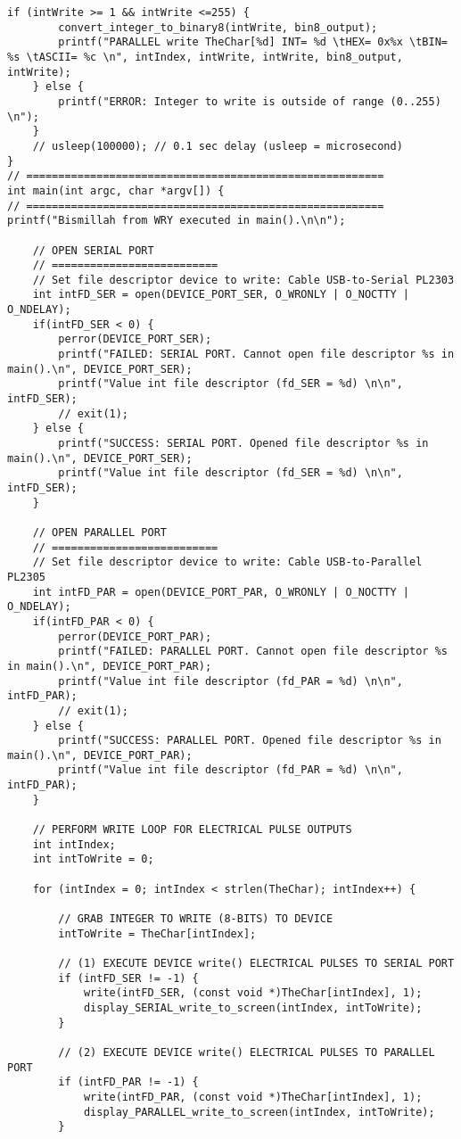 \begin{lstlisting}[caption={App4-Concurrent Writes to Parallel and Serial Ports}, label=App4-Concurrent Writes to Parallel and Serial Ports]
	if (intWrite >= 1 && intWrite <=255) {
		convert_integer_to_binary8(intWrite, bin8_output);	
		printf("PARALLEL write TheChar[%d] INT= %d \tHEX= 0x%x \tBIN= %s \tASCII= %c \n", intIndex, intWrite, intWrite, bin8_output, intWrite);
	} else {
		printf("ERROR: Integer to write is outside of range (0..255) \n"); 	
	}
	// usleep(100000); // 0.1 sec delay (usleep = microsecond)
}
// ========================================================
int main(int argc, char *argv[]) {
// ========================================================
printf("Bismillah from WRY executed in main().\n\n");

	// OPEN SERIAL PORT
	// ==========================
	// Set file descriptor device to write: Cable USB-to-Serial PL2303
	int intFD_SER = open(DEVICE_PORT_SER, O_WRONLY | O_NOCTTY | O_NDELAY); 
	if(intFD_SER < 0) {
		perror(DEVICE_PORT_SER);
		printf("FAILED: SERIAL PORT. Cannot open file descriptor %s in main().\n", DEVICE_PORT_SER);
		printf("Value int file descriptor (fd_SER = %d) \n\n", intFD_SER);
		// exit(1);
	} else {
		printf("SUCCESS: SERIAL PORT. Opened file descriptor %s in main().\n", DEVICE_PORT_SER);
		printf("Value int file descriptor (fd_SER = %d) \n\n", intFD_SER);
	}
	
	// OPEN PARALLEL PORT
	// ==========================
	// Set file descriptor device to write: Cable USB-to-Parallel PL2305
	int intFD_PAR = open(DEVICE_PORT_PAR, O_WRONLY | O_NOCTTY | O_NDELAY); 
	if(intFD_PAR < 0) {
		perror(DEVICE_PORT_PAR);
		printf("FAILED: PARALLEL PORT. Cannot open file descriptor %s in main().\n", DEVICE_PORT_PAR);
		printf("Value int file descriptor (fd_PAR = %d) \n\n", intFD_PAR);
		// exit(1);
	} else {
		printf("SUCCESS: PARALLEL PORT. Opened file descriptor %s in main().\n", DEVICE_PORT_PAR);
		printf("Value int file descriptor (fd_PAR = %d) \n\n", intFD_PAR);
	} 
	
	// PERFORM WRITE LOOP FOR ELECTRICAL PULSE OUTPUTS
	int intIndex;
	int intToWrite = 0;
	
	for (intIndex = 0; intIndex < strlen(TheChar); intIndex++) {
	
		// GRAB INTEGER TO WRITE (8-BITS) TO DEVICE
		intToWrite = TheChar[intIndex]; 
	
		// (1) EXECUTE DEVICE write() ELECTRICAL PULSES TO SERIAL PORT 
		if (intFD_SER != -1) {
			write(intFD_SER, (const void *)TheChar[intIndex], 1); 
			display_SERIAL_write_to_screen(intIndex, intToWrite);
		}

		// (2) EXECUTE DEVICE write() ELECTRICAL PULSES TO PARALLEL PORT
		if (intFD_PAR != -1) {
			write(intFD_PAR, (const void *)TheChar[intIndex], 1); 
			display_PARALLEL_write_to_screen(intIndex, intToWrite);
		}


\end{lstlisting}
